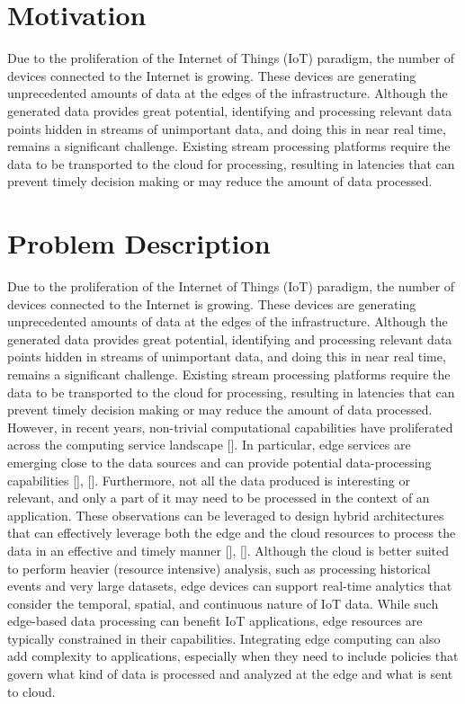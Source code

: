 \section{Motivation}

Due to the proliferation of the Internet of Things (IoT) paradigm, the number of devices connected to the Internet is growing. These devices are generating unprecedented amounts of data at the edges of the infrastructure. Although the generated data provides great potential, identifying and processing relevant data points hidden in streams of unimportant data, and doing this in near real time, remains a significant challenge. Existing stream processing platforms require the data to be transported to the cloud for processing, resulting in latencies that can prevent timely decision making or may reduce the amount of data processed.



\section{Problem Description}
Due to the proliferation of the Internet of Things (IoT) paradigm, the number of devices connected to the Internet is growing. These devices are generating unprecedented amounts of data at the edges of the infrastructure. Although the generated data provides great potential, identifying and processing relevant data points hidden in streams of unimportant data, and doing this in near real time, remains a significant challenge. Existing stream processing platforms require the data to be transported to the
cloud for processing, resulting in latencies that can prevent timely decision making or may reduce the amount of data processed. However, in recent years, non-trivial computational capabilities have proliferated across the computing service landscape []. In particular, edge services are emerging close to the data sources and can provide potential data-processing capabilities [], []. Furthermore, not all the data produced is interesting or relevant, and only a part of it may need to be processed in the context of an application. These observations can be leveraged to design hybrid architectures that can
effectively leverage both the edge and the cloud resources to process the data in an effective and timely manner [], []. Although the cloud is better suited to perform heavier (resource intensive) analysis, such as processing historical events and very large datasets, edge devices can support real-time analytics that consider the temporal, spatial, and continuous nature of IoT data. While such edge-based data processing can benefit IoT applications, edge resources are typically constrained in their capabilities. Integrating edge computing can also add complexity to applications, especially when they need to include policies that govern what kind of data is processed and analyzed at the edge and what is sent to cloud.

